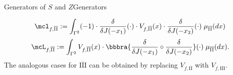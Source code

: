 \begin{mdef}{Generators of $S$ and $Z$}{Generators}
                
    \[
        \mcl_{f,\overline{\text{II}}} := \int_{\Gamma^2}(-1)\cdot\frac{\delta}{\delta J(-x_1)}(\cdot)\cdot V_{f,\overline{\text{II}}}(x)\cdot\frac{\delta}{\delta J(-x_2)}(\cdot)\;\mu_{\overline{\text{II}}}(dx)
    \]
    \[
        \mcL_{f,\overline{\text{II}}} := \int_{\Gamma^2}V_{f,\overline{\text{II}}}(x)\cdot\bbbra{
            \frac{\delta}{\delta J(-x_1)}\circ\frac{\delta}{\delta J(-x_2)}
        }(\cdot)\;\mu_{\overline{\text{II}}}(dx).
    \]
    The analogous cases for $\overline{\text{III}}$ can be obtained by replacing $V_{f,\overline{\text{II}}}$ with $V_{f,\overline{\text{III}}}$.
    
\end{mdef}
